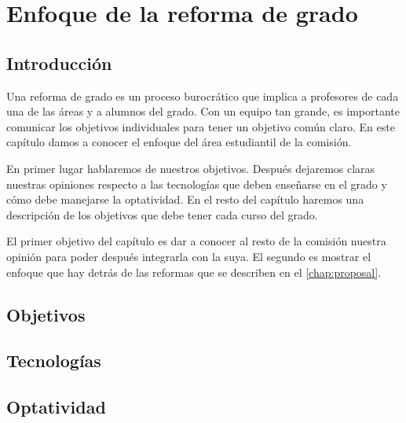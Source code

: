 \chapter{Enfoque de la reforma de grado}

\section{Introducción}


Una reforma de grado es un proceso burocrático que implica a
profesores de cada una de las áreas y a alumnos del grado.
Con un equipo tan grande,
es importante comunicar los objetivos individuales para
tener un objetivo común claro.
En este capítulo damos a conocer el enfoque del área estudiantil de la comisión.


En primer lugar hablaremos de nuestros objetivos.
Después dejaremos claras nuestras opiniones respecto a
las tecnologías que deben enseñarse en el grado y
cómo debe manejarse la optatividad.
En el resto del capítulo
haremos una descripción de los objetivos que debe tener cada curso del grado.


El primer objetivo del capítulo es
dar a conocer al resto de la comisión nuestra opinión
para poder después integrarla con la suya.
El segundo es mostrar el enfoque que
hay detrás de las reformas que se describen en el \cref{chap:proposal}.

\section{Objetivos}

\section{Tecnologías}


\section{Optatividad}

